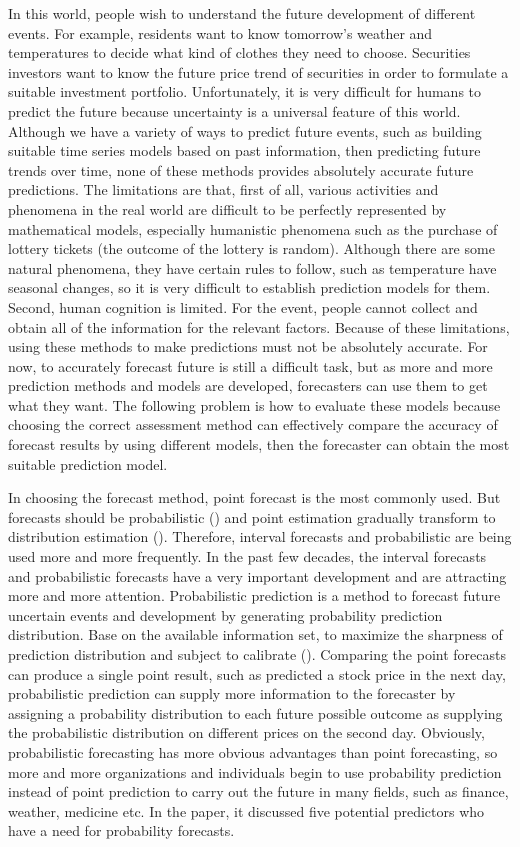 \documentclass{monashthesis}
\theoremstyle{definition}
\theoremstyle{definition}
\theoremstyle{definition}
\theoremstyle{remark}
\begin{document}
In this world, people wish to understand the future development of
different events. For example, residents want to know tomorrow's weather
and temperatures to decide what kind of clothes they need to choose.
Securities investors want to know the future price trend of securities
in order to formulate a suitable investment portfolio. Unfortunately, it
is very difficult for humans to predict the future because uncertainty
is a universal feature of this world. Although we have a variety of ways
to predict future events, such as building suitable time series models
based on past information, then predicting future trends over time, none
of these methods provides absolutely accurate future predictions. The
limitations are that, first of all, various activities and phenomena in
the real world are difficult to be perfectly represented by mathematical
models, especially humanistic phenomena such as the purchase of lottery
tickets (the outcome of the lottery is random). Although there are some
natural phenomena, they have certain rules to follow, such as
temperature have seasonal changes, so it is very difficult to establish
prediction models for them. Second, human cognition is limited. For the
event, people cannot collect and obtain all of the information for the
relevant factors. Because of these limitations, using these methods to
make predictions must not be absolutely accurate. For now, to accurately
forecast future is still a difficult task, but as more and more
prediction methods and models are developed, forecasters can use them to
get what they want. The following problem is how to evaluate these
models because choosing the correct assessment method can effectively
compare the accuracy of forecast results by using different models, then
the forecaster can obtain the most suitable prediction model.

In choosing the forecast method, point forecast is the most commonly
used. But forecasts should be probabilistic (\textcite{GK14}) and point
estimation gradually transform to distribution estimation
(\textcite{S75}). Therefore, interval forecasts and probabilistic are
being used more and more frequently. In the past few decades, the
interval forecasts and probabilistic forecasts have a very important
development and are attracting more and more attention. Probabilistic
prediction is a method to forecast future uncertain events and
development by generating probability prediction distribution. Base on
the available information set, to maximize the sharpness of prediction
distribution and subject to calibrate (\textcite{GK14}). Comparing the
point forecasts can produce a single point result, such as predicted a
stock price in the next day, probabilistic prediction can supply more
information to the forecaster by assigning a probability distribution to
each future possible outcome as supplying the probabilistic distribution
on different prices on the second day. Obviously, probabilistic
forecasting has more obvious advantages than point forecasting, so more
and more organizations and individuals begin to use probability
prediction instead of point prediction to carry out the future in many
fields, such as finance, weather, medicine etc. In the \textcite{R16}
paper, it discussed five potential predictors who have a need for
probability forecasts.
\end{document}
